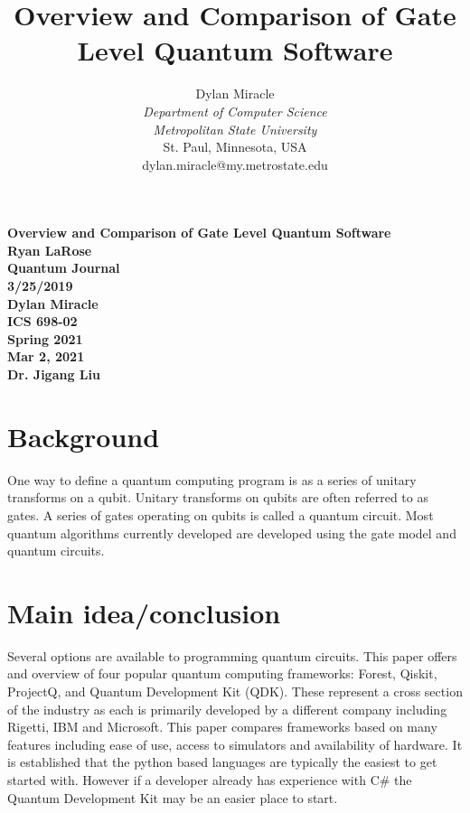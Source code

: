 \documentclass{article}
\begin{document}
\begin{titlepage}
    \begin{center}
        \vspace{4cm}
        \large
        \textbf{
            Overview and Comparison of Gate Level Quantum Software \\
            Ryan LaRose \\
            Quantum Journal \\
            3/25/2019 \\
            Dylan Miracle \\
            ICS 698-02 \\
            Spring 2021 \\
            Mar 2, 2021 \\
            Dr. Jigang Liu
        }
    \end{center}
\end{titlepage}
\title{Overview and Comparison of Gate Level Quantum Software}

\author{Dylan Miracle\\
\textit{Department of Computer Science} \\
\textit{Metropolitan State University}\\
St. Paul, Minnesota, USA \\
dylan.miracle@my.metrostate.edu
}

\maketitle
\section{Background}
One way to define a quantum computing program is as a series of unitary transforms on a qubit. Unitary transforms on qubits are often referred to as gates. A series of gates operating on qubits is called a quantum circuit. Most quantum algorithms currently developed are developed using the gate model and quantum circuits. 

\section{Main idea/conclusion}
Several options are available to programming quantum circuits. This paper offers and overview of four popular quantum computing frameworks: Forest, Qiskit, ProjectQ, and Quantum Development Kit (QDK). These represent a cross section of the industry as each is primarily developed by a different company including Rigetti, IBM and Microsoft. This paper compares frameworks based on many features including ease of use, access to simulators and availability of hardware. It is established that the python based languages are typically the easiest to get started with. However if a developer already has experience with C\# the Quantum Development Kit may be an easier place to start.
\end{document}
